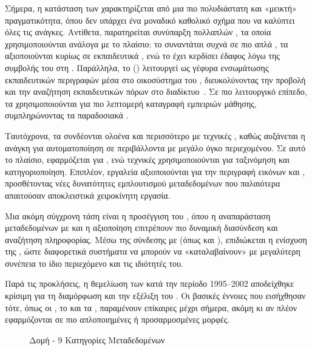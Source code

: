 Σήμερα, η κατάσταση των  χαρακτηρίζεται από μια πιο πολυδιάστατη και «μεικτή» πραγματικότητα, όπου δεν υπάρχει ένα μοναδικό καθολικό σχήμα που να καλύπτει όλες τις ανάγκες. Αντίθετα, παρατηρείται συνύπαρξη πολλαπλών , τα οποία χρησιμοποιούνται ανάλογα με το πλαίσιο: το  συναντάται συχνά σε πιο απλά , τα  αξιοποιούνται κυρίως σε εκπαιδευτικά , ενώ το  έχει κερδίσει έδαφος λόγω της συμβολής του στη . Παράλληλα, το  () λειτουργεί ως γέφυρα ενσωμάτωσης εκπαιδευτικών περιγραφών μέσα στο οικοσύστημα του , διευκολύνοντας την προβολή και την αναζήτηση εκπαιδευτικών πόρων στο διαδίκτυο~\cite{lrmi2024guide}. Σε πιο λειτουργικό επίπεδο, τα   χρησιμοποιούνται για πιο λεπτομερή καταγραφή εμπειριών μάθησης, συμπληρώνοντας τα παραδοσιακά .

Ταυτόχρονα, τα  συνδέονται ολοένα και περισσότερο με τεχνικές , καθώς αυξάνεται η ανάγκη για αυτοματοποίηση σε περιβάλλοντα με μεγάλο όγκο περιεχομένου. Σε αυτό το πλαίσιο, εφαρμόζεται  για , ενώ τεχνικές  χρησιμοποιούνται για ταξινόμηση και κατηγοριοποίηση. Επιπλέον, εργαλεία  αξιοποιούνται για την περιγραφή εικόνων και , προσθέτοντας νέες δυνατότητες εμπλουτισμού μεταδεδομένων που παλαιότερα απαιτούσαν αποκλειστικά χειροκίνητη εργασία.

Μια ακόμη σύγχρονη τάση είναι η προσέγγιση του , όπου η αναπαράσταση μεταδεδομένων με  και η αξιοποίηση  επιτρέπουν πιο δυναμική διασύνδεση και αναζήτηση πληροφορίας. Μέσω της σύνδεσης με  (όπως  και ), επιδιώκεται η ενίσχυση της , ώστε διαφορετικά συστήματα να μπορούν να «καταλαβαίνουν» με μεγαλύτερη συνέπεια το ίδιο περιεχόμενο και τις ιδιότητές του.

Παρά τις προκλήσεις, η θεμελίωση των  κατά την περίοδο 1995–2002 αποδείχθηκε κρίσιμη για τη διαμόρφωση και την εξέλιξη του . Οι βασικές έννοιες που εισήχθησαν τότε, όπως οι , το  και τα , παραμένουν επίκαιρες μέχρι σήμερα, ακόμη κι αν πλέον εφαρμόζονται σε πιο απλοποιημένες ή προσαρμοσμένες μορφές.

\begin{figure}[H]
  \centering
  \resizebox{\textwidth}{!}{%
    
  }
  \caption{Δομή   - 9 Κατηγορίες Μεταδεδομένων}
  \label{fig:ieee_lom}
\end{figure}
